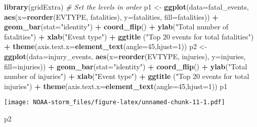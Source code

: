 \documentclass[]{article}
\newenvironment{Shaded}{\begin{snugshade}}{\end{snugshade}}
\newcommand{\KeywordTok}[1]{\textcolor[rgb]{0.13,0.29,0.53}{\textbf{#1}}}
\newcommand{\DataTypeTok}[1]{\textcolor[rgb]{0.13,0.29,0.53}{#1}}
\newcommand{\DecValTok}[1]{\textcolor[rgb]{0.00,0.00,0.81}{#1}}
\newcommand{\StringTok}[1]{\textcolor[rgb]{0.31,0.60,0.02}{#1}}
\newcommand{\CommentTok}[1]{\textcolor[rgb]{0.56,0.35,0.01}{\textit{#1}}}
\newcommand{\OperatorTok}[1]{\textcolor[rgb]{0.81,0.36,0.00}{\textbf{#1}}}
\newcommand{\NormalTok}[1]{#1}
\begin{document}
\begin{Shaded}
\begin{Highlighting}[]
\KeywordTok{library}\NormalTok{(gridExtra)}
\CommentTok{# Set the levels in order}
\NormalTok{p1 <-}\StringTok{ }\KeywordTok{ggplot}\NormalTok{(}\DataTypeTok{data=}\NormalTok{fatal_events,}
             \KeywordTok{aes}\NormalTok{(}\DataTypeTok{x=}\KeywordTok{reorder}\NormalTok{(EVTYPE, fatalities), }\DataTypeTok{y=}\NormalTok{fatalities, }\DataTypeTok{fill=}\NormalTok{fatalities)) }\OperatorTok{+}
\StringTok{    }\KeywordTok{geom_bar}\NormalTok{(}\DataTypeTok{stat=}\StringTok{"identity"}\NormalTok{) }\OperatorTok{+}
\StringTok{    }\KeywordTok{coord_flip}\NormalTok{() }\OperatorTok{+}
\StringTok{    }\KeywordTok{ylab}\NormalTok{(}\StringTok{"Total number of fatalities"}\NormalTok{) }\OperatorTok{+}
\StringTok{    }\KeywordTok{xlab}\NormalTok{(}\StringTok{"Event type"}\NormalTok{) }\OperatorTok{+}
\StringTok{ }\KeywordTok{ggtitle}\NormalTok{ (}\StringTok{"Top 20 events for total fatalities"}\NormalTok{) }\OperatorTok{+}
\StringTok{    }\KeywordTok{theme}\NormalTok{(}\DataTypeTok{axis.text.x=}\KeywordTok{element_text}\NormalTok{(}\DataTypeTok{angle=}\DecValTok{45}\NormalTok{,}\DataTypeTok{hjust=}\DecValTok{1}\NormalTok{))}
\NormalTok{p2 <-}\StringTok{ }\KeywordTok{ggplot}\NormalTok{(}\DataTypeTok{data=}\NormalTok{injury_events,}
             \KeywordTok{aes}\NormalTok{(}\DataTypeTok{x=}\KeywordTok{reorder}\NormalTok{(EVTYPE, injuries), }\DataTypeTok{y=}\NormalTok{injuries, }\DataTypeTok{fill=}\NormalTok{injuries)) }\OperatorTok{+}
\StringTok{    }\KeywordTok{geom_bar}\NormalTok{(}\DataTypeTok{stat=}\StringTok{"identity"}\NormalTok{) }\OperatorTok{+}
\StringTok{    }\KeywordTok{coord_flip}\NormalTok{() }\OperatorTok{+}\StringTok{ }
\StringTok{    }\KeywordTok{ylab}\NormalTok{(}\StringTok{"Total number of injuries"}\NormalTok{) }\OperatorTok{+}
\StringTok{    }\KeywordTok{xlab}\NormalTok{(}\StringTok{"Event type"}\NormalTok{) }\OperatorTok{+}
\StringTok{ }\KeywordTok{ggtitle}\NormalTok{ (}\StringTok{"Top 20 events for total injuries"}\NormalTok{) }\OperatorTok{+}
\StringTok{    }\KeywordTok{theme}\NormalTok{(}\DataTypeTok{axis.text.x=}\KeywordTok{element_text}\NormalTok{(}\DataTypeTok{angle=}\DecValTok{45}\NormalTok{,}\DataTypeTok{hjust=}\DecValTok{1}\NormalTok{))}
\NormalTok{p1}
\end{Highlighting}
\end{Shaded}

\texttt{[image: NOAA-storm\_files/figure-latex/unnamed-chunk-11-1.pdf]}

\begin{Shaded}
\begin{Highlighting}[]
\NormalTok{p2}
\end{Highlighting}
\end{Shaded}
\end{document}
